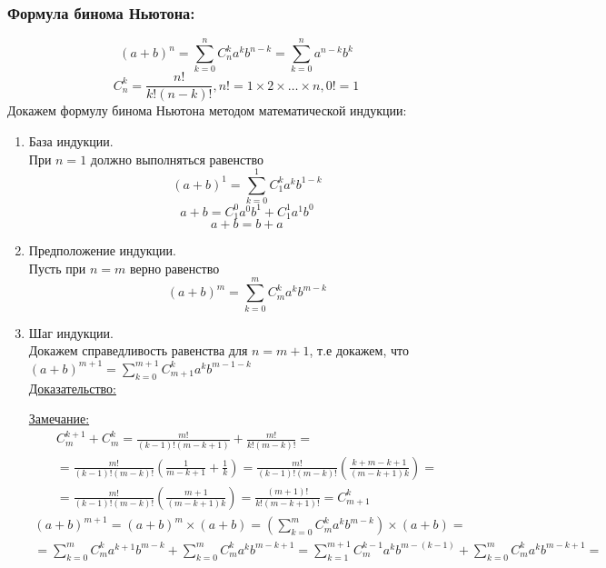 \documentclass[12pt]{article}
\begin{document}
    \subsubsection*{Формула бинома Ньютона:}
    \begin{equation*}
        (a+b)^n=\sum_{k=0}^nC_{n}^{k}a^{k}b^{n-k}=\sum_{k=0}^na^{n-k}b^{k}
    \end{equation*}
    \begin{equation*}
        C_{n}^{k}=\frac{n!}{k!(n-k)!}, n! = 1 \times 2 \times \dots \times n, 0! = 1
    \end{equation*}
    Докажем формулу бинома Ньютона методом математической индукции:
    \begin{enumerate}
        \item База индукции.\\
        При $n = 1$ должно выполняться равенство 
        \[(a+b)^{1} = \sum_{k=0}^{1}C^{k}_{1}a^{k}b^{1-k}\]
        \[a+b = C^{0}_{1}a^{0}b^{1} + C^{1}_{1}a^{1}b^{0}\]
        \[a+b = b+a\]
        \item Предположение индукции.\\
        Пусть при $n = m$ верно равенство 
        \[(a+b)^{m} = \sum_{k=0}^{m}C^{k}_{m}a^{k}b^{m-k}\]
        \item Шаг индукции.\\
        Докажем справедливость равенства для $n = m + 1$, т.е докажем, что $(a+b)^{m+1} = \sum_{k=0}^{m + 1}C^{k}_{m+1}a^{k}b^{m-1-k}$\\
        \underline{Доказательство:}
        \begin{adjustwidth}{1.5em}{1.5em}
            \underline{Замечание:} 
            \begin{gather*}
                C^{k+1}_{m} + C^{k}_{m} = \frac{m!}{(k-1)!(m-k+1)} + \frac{m!}{k!(m-k)!} =\\
                = \frac{m!}{(k-1)!(m-k)!}(\frac{1}{m-k+1} + \frac{1}{k}) = \frac{m!}{(k-1)!(m-k)!}(\frac{k+m-k+1}{(m-k+1)k}) =\\
                = \frac{m!}{(k-1)!(m-k)!}(\frac{m+1}{(m-k+1)k}) = \frac{(m+1)!}{k!(m-k+1)!} = C^{k}_{m+1}
            \end{gather*}
            \begin{gather*}
                (a+b)^{m+1}=(a+b)^m \times (a+b) = \left(\sum_{k=0}^{m}C^{k}_{m}a^{k}b^{m-k}\right) \times (a+b) =\\
                =\sum_{k=0}^{m}C^{k}_{m}a^{k+1}b^{m-k} + \sum_{k=0}^{m}C^{k}_{m}a^{k}b^{m-k+1} = \sum_{k=1}^{m+1}C^{k-1}_{m}a^{k}b^{m-(k-1)} + \sum_{k=0}^{m}C^{k}_{m}a^{k}b^{m-k+1} =\\

\end{gather*}
\end{adjustwidth}
\end{enumerate}
\end{document}
